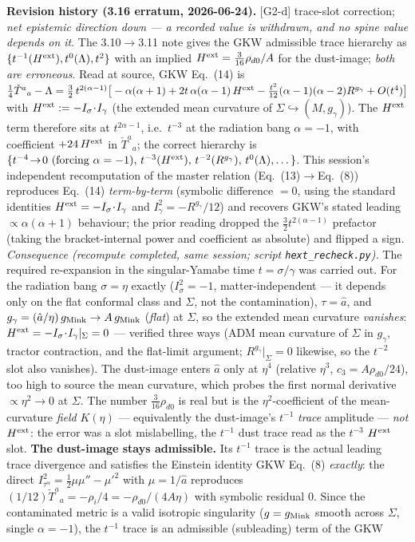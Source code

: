 \documentclass[11pt]{article}
\begin{document}
{\smallskip\noindent\textbf{Revision history (3.16 erratum, 2026-06-24).} [G2-d] trace-slot correction; \emph{net epistemic direction down --- a recorded value is withdrawn, and no spine value depends on it}. The 3.10$\to$3.11 note gives the GKW admissible trace hierarchy as $\{t^{-1}(H^{\rm ext}),t^{0}(\Lambda),t^{2}\}$ with an implied $H^{\rm ext}=\tfrac{3}{16}\rho_{d0}/A$ for the dust-image; \emph{both are erroneous}. Read at source, GKW Eq.~(14) is $\tfrac14\check T^a{}_a-\Lambda=\tfrac32\,t^{2(\alpha-1)}\big[-\alpha(\alpha+1)+2t\,\alpha(\alpha-1)\,H^{\rm ext}-\tfrac{t^2}{12}(\alpha-1)(\alpha-2)R^{g_\gamma}+O(t^4)\big]$ with $H^{\rm ext}:=-I_\sigma\!\cdot\!I_\gamma$ (the extended mean curvature of $\Sigma\hookrightarrow(M,g_\gamma)$). The $H^{\rm ext}$ term therefore sits at $t^{2\alpha-1}$, i.e.\ $t^{-3}$ at the radiation bang $\alpha=-1$, with coefficient $+24\,H^{\rm ext}$ in $\check T^a{}_a$; the correct hierarchy is $\{t^{-4}\!\to\!0\ (\text{forcing }\alpha=-1),\,t^{-3}(H^{\rm ext}),\,t^{-2}(R^{g_\gamma}),\,t^{0}(\Lambda),\dots\}$. This session's independent recomputation of the master relation (Eq.~(13)$\to$Eq.~(8)) reproduces Eq.~(14) \emph{term-by-term} (symbolic difference $=0$, using the standard identities $H^{\rm ext}=-I_\sigma\!\cdot\!I_\gamma$ and $I_\gamma^2=-R^{g_\gamma}/12$) and recovers GKW's stated leading $\propto\alpha(\alpha+1)$ behaviour; the prior reading dropped the $\tfrac32 t^{2(\alpha-1)}$ prefactor (taking the bracket-internal power and coefficient as absolute) and flipped a sign. \emph{Consequence (recompute completed, same session; script \texttt{hext\_recheck.py}).} The required re-expansion in the singular-Yamabe time $t=\sigma/\gamma$ was carried out. For the radiation bang $\sigma=\eta$ exactly ($I_\sigma^2=-1$, matter-independent --- it depends only on the flat conformal class and $\Sigma$, not the contamination), $\tau=\hat a$, and $g_\gamma=(\hat a/\eta)\,g_{\rm Mink}\to A\,g_{\rm Mink}$ (\emph{flat}) at $\Sigma$, so the extended mean curvature \emph{vanishes}: $H^{\rm ext}=-I_\sigma\!\cdot\!I_\gamma|_\Sigma=0$ --- verified three ways (ADM mean curvature of $\Sigma$ in $g_\gamma$, tractor contraction, and the flat-limit argument; $R^{g_\gamma}|_\Sigma=0$ likewise, so the $t^{-2}$ slot also vanishes). The dust-image enters $\hat a$ only at $\eta^4$ (relative $\eta^3$, $c_3=A\rho_{d0}/24$), too high to source the mean curvature, which probes the first normal derivative $\propto\eta^2\!\to\!0$ at $\Sigma$. The number $\tfrac{3}{16}\rho_{d0}$ is real but is the $\eta^2$-coefficient of the mean-curvature \emph{field} $K(\eta)$ --- equivalently the dust-image's $t^{-1}$ \emph{trace} amplitude --- \emph{not} $H^{\rm ext}$: the error was a slot mislabelling, the $t^{-1}$ dust trace read as the $t^{-3}$ $H^{\rm ext}$ slot. \textbf{The dust-image stays admissible.} Its $t^{-1}$ trace is the actual leading trace divergence and satisfies the Einstein identity GKW Eq.~(8) \emph{exactly}: the direct $I^2_{\tau^\alpha}=\tfrac12\mu\mu''-\mu'^2$ with $\mu=1/\hat a$ reproduces $(1/12)\check T^a{}_a=-\rho_i/4=-\rho_{d0}/(4A\eta)$ with symbolic residual $0$. Since the contaminated metric is a valid isotropic singularity ($g=g_{\rm Mink}$ smooth across $\Sigma$, single $\alpha=-1$), the $t^{-1}$ trace is an admissible (subleading) term of the GKW }
\end{document}
